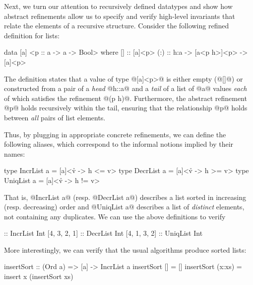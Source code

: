 {{{{Next, we turn our attention to recursively defined datatypes and show 
how abstract refinements allow us to specify and verify high-level
invariants that relate the elements of a recursive structure.
Consider the following refined definition for lists:
%
\begin{code}
  data [a] <p :: a -> a -> Bool> where
    []  :: [a]<p>
    (:) :: h:a -> [a<p h>]<p> -> [a]<p>
\end{code}
%
%
The definition states that a value of type @[a]<p>@ 
is either empty (@[]@) or constructed from a pair of  
a \emph{head} @h::a@ and a \emph{tail} of a list of 
@a@ values \emph{each} of which satisfies the refinement @(p h)@. 
Furthermore, the abstract refinement @p@ holds recursively
within the tail, ensuring that the relationship @p@ 
holds between \emph{all} pairs of list elements.

Thus, by plugging in appropriate concrete refinements, 
we can define the following aliases, which correspond 
to the informal notions implied by their names:
\begin{code}
  type IncrList a = [a]<{\h v -> h <= v}>
  type DecrList a = [a]<{\h v -> h >= v}>
  type UniqList a = [a]<{\h v -> h != v}>
\end{code}
%
That is, @IncrList a@ (resp. @DecrList a@) describes a list sorted
in increasing (resp. decreasing) order and @UniqList a@ describes
a list of \emph{distinct} elements, \ie not containing any duplicates.
We can use the above definitions to verify
%
\begin{code}
  [1, 2, 3, 4] :: IncrList Int
  [4, 3, 2, 1] :: DecrList Int
  [4, 1, 3, 2] :: UniqList Int
\end{code}
%
%
%
%
%
More interestingly, we can verify that the usual algorithms 
produce sorted lists:
%
\begin{code}
  insertSort :: (Ord a) => [a] -> IncrList a 
  insertSort []     = []
  insertSort (x:xs) = insert x (insertSort xs) 
  

\end{code}}}}}
